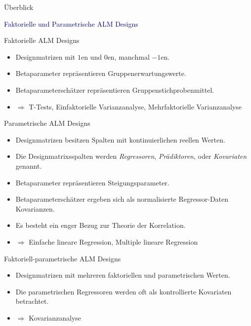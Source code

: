 \documentclass[
  8pt,
  ignorenonframetext,
]{beamer}
\providecommand{\tightlist}{%
  \setlength{\itemsep}{0pt}\setlength{\parskip}{0pt}}
\begin{document}
\begin{frame}{Überblick}
\protect\hypertarget{uxfcberblick-1}{}
\vspace{2mm}

\textcolor{darkblue}{Faktorielle und Parametrische ALM Designs}

\small

Faktorielle ALM Designs \vspace{-2mm}

\begin{itemize}
\tightlist
\item
  Designmatrizen mit \(1\)en und \(0\)en, manchmal \(-1\)en.
\item
  Betaparameter repräsentieren Gruppenerwartungswerte.
\item
  Betaparameterschätzer repräsentieren Gruppenstichprobenmittel.
\item
  \(\Rightarrow\) T-Tests, Einfaktorielle Varianzanalyse,
  Mehrfaktorielle Varianzanalyse
\end{itemize}

Parametrische ALM Designs \vspace{-2mm}

\begin{itemize}
\tightlist
\item
  Designmatrizen besitzen Spalten mit kontinuierlichen reellen Werten.
\item
  Die Designmatrixsspalten werden \emph{Regressoren},
  \emph{Prädiktoren}, oder \emph{Kovariaten} genannt.
\item
  Betaparameter repräsentieren Steigungsparameter.
\item
  Betaparameterschätzer ergeben sich als normalisierte Regressor-Daten
  Kovarianzen.
\item
  Es besteht ein enger Bezug zur Theorie der Korrelation.
\item
  \(\Rightarrow\) Einfache lineare Regression, Multiple lineare
  Regression
\end{itemize}

Faktoriell-parametrische ALM Designs \vspace{-2mm}

\begin{itemize}
\tightlist
\item
  Designmatrizen mit mehreren faktoriellen und parametrischen Werten.
\item
  Die parametrischen Regressoren werden oft als kontrollierte Kovariaten
  betrachtet.
\item
  \(\Rightarrow\) Kovarianzanalyse
\end{itemize}
\end{frame}
\end{document}

